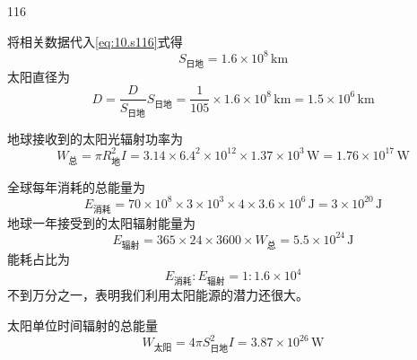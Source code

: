 \begin{solution}{116}
\begin{subsolution}
\begin{subsubsolution}
            将相关数据代入\eqref{eq:10.s116}式得
            \begin{equation}
                S_{\mathrm{日地}} = 1.6 \times 10^{8} \,\mathrm{km}
                \label{eq:12.s116}
            \end{equation}
            太阳直径为
            \begin{equation}
                D = \frac{D}{S_{\mathrm{日地}}} S_{\mathrm{日地}} = \frac{1}{105} \times 1.6 \times 10^{8} \,\mathrm{km} = 1.5 \times 10^{6} \,\mathrm{km}
            \end{equation}
        \end{subsubsolution}
    \end{subsolution}
    \begin{subsolution}
        \begin{subsubsolution}
            地球接收到的太阳光辐射功率为
            \begin{equation}
                W_{\text{总}} = \pi R_{\text{地}}^{2} I = 3.14 \times 6.4^{2} \times 10^{12} \times 1.37 \times 10^{3} \,\mathrm{W} = 1.76 \times 10^{17} \,\mathrm{W}
                \label{eq:13.s116}
            \end{equation}
        \end{subsubsolution}
        \begin{subsubsolution}
            全球每年消耗的总能量为
            \begin{equation}
                E_{\text{消耗}} = 70 \times 10^{8} \times 3 \times 10^{3} \times 4 \times 3.6 \times 10^{6} \,\mathrm{J} = 3 \times 10^{20} \,\mathrm{J}
            \end{equation}
            地球一年接受到的太阳辐射能量为
            \begin{equation}
                E_{\mathrm{辐射}} = 365 \times 24 \times 3600 \times W_{\mathrm{总}} = 5.5 \times 10^{24} \,\mathrm{J}
            \end{equation}
            能耗占比为
            \begin{equation}
                E_{\text{消耗}} : E_{\text{辐射}} = 1 : 1.6 \times 10^{4}
                \label{eq:14.s116}
            \end{equation}
            不到万分之一，表明我们利用太阳能源的潜力还很大。
        \end{subsubsolution}
        \begin{subsubsolution}
            太阳单位时间辐射的总能量
            \begin{equation}
                W_{\mathrm{太阳}} = 4\pi S_{\mathrm{日地}}^{2} I = 3.87 \times 10^{26} \,\mathrm{W}

\end{equation}
\end{subsubsolution}
\end{subsolution}
\end{solution}
